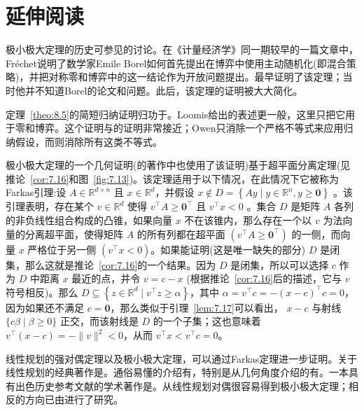 \section{延伸阅读}\label{sec:8.6}
极小极大定理的历史可参见\citet{vonneumann1953}的讨论。在《计量经济学》同一期较早的一篇文章中，Fréchet说明了数学家Emile Borel如何首先提出在博弈中使用主动随机化(即混合策略)，并把对称零和博弈中的这一结论作为开放问题提出。\citet{vonneumann1928}最早证明了该定理；当时他并不知道Borel的论文和问题。此后，该定理的证明被大大简化。

定理~\ref{theo:8.5}的简短归纳证明归功于\citet{loomis1946}。Loomis给出的表述更一般，这里只把它用于零和博弈。这个证明与\citet{owen1967}的证明非常接近；Owen只消除一个严格不等式来应用归纳假设，而\citet{loomis1946}则消除所有这类不等式。

极小极大定理的一个几何证明(\citet{vonneumann1947}的著作中也使用了该证明)基于超平面分离定理(见推论~\ref{cor:7.16}和图~\ref{fig:7.13})。该定理适用于以下情况，在此情况下它被称为Farkas引理:设 \(A \in  {\mathbb{R}}^{d \times  n}\) 且 \(x \in  {\mathbb{R}}^{d}\)，并假设 \(x \notin  D = \left\{  {{Ay} \mid  y \in  {\mathbb{R}}^{n},y \geq  \mathbf{0}}\right\}\) 。该引理表明，存在某个 \(v \in  {\mathbb{R}}^{d}\) 使得 \({v}^{\top }A \geq  {\mathbf{0}}^{\top }\) 且 \({v}^{\top }x < 0\) 。集合 \(D\) 是矩阵 \(A\) 各列的非负线性组合构成的凸锥，如果向量 \(x\) 不在该锥内，那么存在一个以 \(v\) 为法向量的分离超平面，使得矩阵 \(A\) 的所有列都在超平面 \(\left( {{v}^{\top }A \geq  {\mathbf{0}}^{\top }}\right)\) 的一侧，而向量 \(x\) 严格位于另一侧 \(\left( {{v}^{\top }x < 0}\right)\)。如果能证明(这是唯一缺失的部分) \(D\) 是闭集，那么这就是推论~\ref{cor:7.16}的一个结果。因为 \(D\) 是闭集，所以可以选择 \(c\) 作为 \(D\) 中距离 \(x\) 最近的点，并令 \(v = c - x\) (根据推论~\ref{cor:7.16}后的描述，它与 \(v\) 符号相反)。那么 \(D \subseteq  \left\{  {z \in  {\mathbb{R}}^{d} \mid  {v}^{\top }z \geq  \alpha }\right\}\)，其中 \(\alpha  = {v}^{\top }c =  - {\left( x - c\right) }^{\top }c = 0\)，因为如果还不满足 \(c = \mathbf{0}\)，那么类似于引理~\ref{lem:7.17}可以看出， \(x - c\) 与射线 \(\{ {c\beta } \mid  \beta  \geq  0\}\) 正交，而该射线是 \(D\) 的一个子集；这也意味着 \({v}^{\top }\left( {x - c}\right)  = -\| v\|^{2} < 0\)，从而 \({v}^{\top }x < {v}^{\top }c = 0\)。

线性规划的强对偶定理以及极小极大定理，可以通过Farkas定理进一步证明\citep[见][p.~78f]{gale1960}。关于线性规划的经典著作是\citet{dantzig1963}。通俗易懂的介绍有\citet{chvatal1983}，特别是从几何角度介绍的有\citet{matousek2007}。一本具有出色历史参考文献的学术著作是\citet{schrijver1986}。从线性规划对偶很容易得到极小极大定理；相反的方向已由\citet{adler2013}进行了研究。

